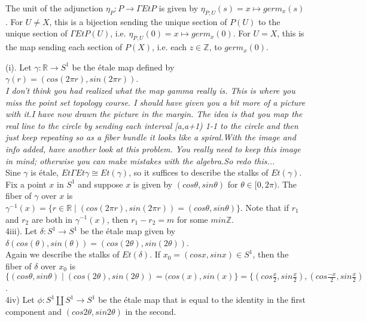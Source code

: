 The unit of the adjunction $\eta_P: P \rightarrow \Gamma EtP$ is given by $\eta_{P,U}(s)= x \mapsto germ_x(s)$. For $U \neq X$, this is a bijection sending the unique section of $P(U)$ to the unique section of $\Gamma EtP(U)$, i.e. $\eta_{P,U}(0)= x \mapsto germ_x(0)$. For $U = X$, this is the map sending each section of $P(X)$, i.e. each $z \in \mathbb{Z}$, to $germ_x(0)$. 

(i).  Let $\gamma: \mathbb{R} \rightarrow S^1$ be the \'etale map defined by $\gamma(r) = (cos(2\pi r), sin(2\pi r))$.\\

\textit{I don't think you had realized what the map gamma really is. This is where you miss the point set topology course. I should have given you a bit more of a picture with it.I have now drawn the picture in the margin. The idea is that you map the real line  to the circle by  sending each interval [a,a+1) 1-1 to the circle and then just keep repeating so as a fiber bundle it looks like a spiral.With the image and info added, have another look at this problem. You really need to keep this image in mind; otherwise you can make mistakes with the algebra.So redo this...}\\

Sine $\gamma$ is \'etale, $Et \Gamma Et \gamma \cong Et(\gamma)$, so it suffices to describe the stalks of $Et(\gamma)$. Fix a point $x$ in $S^1$ and suppose $x$ is given by $(cos\theta, sin\theta)$ for $\theta \in [0,2\pi)$. The fiber of $\gamma$ over $x$ is $\gamma^{-1}(x)=\{r \in \mathbb{R} \mid (cos(2\pi r), sin(2\pi r)) = (cos\theta, sin\theta)\}$. Note that if $r_1$ and $r_2$ are both in $\gamma^{-1}(x)$, then $r_1-r_2=m$ for some $m in \mathbb{Z}$.\\

4iii). Let $\delta:S^1 \rightarrow S^1$ be the \'etale map given by $\delta(cos(\theta), sin(\theta))=(cos(2\theta), sin(2\theta))$.\\

Again we describe the stalks of $Et(\delta)$. If $x_0 = (cosx,sinx) \in S^1$, then the fiber of $\delta$ over $x_0$ is $\{(cos\theta, sin\theta) \mid (cos(2\theta), sin(2\theta))=(cos(x), sin(x)\} = \{(cos\frac{x}{2}, sin\frac{x}{2}), (cos\frac{-x}{2}, sin\frac{x}{2})$.\\

4iv) Let $\phi: S^1 \coprod S^1 \rightarrow S^1$ be the \'etale map that is equal to the identity in the first component and $(cos2\theta, sin2\theta)$ in the second. 


